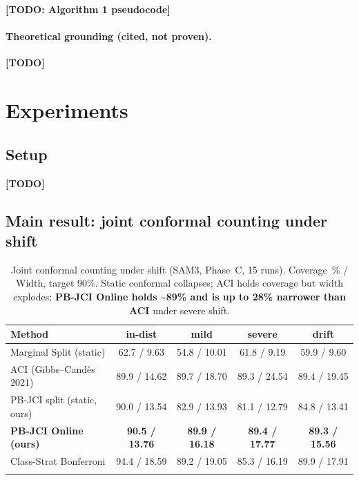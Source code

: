 \documentclass[pdflatex,sn-mathphys,Numbered]{sn-jnl}
\theoremstyle{remark}
\begin{document}
\textbf{[TODO: Algorithm 1 pseudocode]}

\paragraph{Theoretical grounding (cited, not proven).}
\textbf{[TODO]}

\section{Experiments}\label{sec:exp}

\subsection{Setup}\label{sec:setup}

\textbf{[TODO]}

\subsection{Main result: joint conformal counting under shift}\label{sec:main}

\begin{table}[t]
\caption{Joint conformal counting under shift (SAM3, Phase~C, 15 runs).
Coverage~\% / Width, target 90\%. Static conformal collapses; ACI holds
coverage but width explodes; \textbf{PB-JCI Online holds \textasciitilde89\%
and is up to 28\% narrower than ACI} under severe shift.}
\label{tab:main}
\begin{tabular}{@{}lcccc@{}}
\toprule
Method & in-dist & mild & severe & drift \\
\midrule
Marginal Split (static)       & 62.7 / 9.63  & 54.8 / 10.01 & 61.8 / 9.19  & 59.9 / 9.60 \\
ACI (Gibbs--Cand\`es 2021)    & 89.9 / 14.62 & 89.7 / 18.70 & 89.3 / 24.54 & 89.4 / 19.45 \\
PB-JCI split (static, ours)   & 90.0 / 13.54 & 82.9 / 13.93 & 81.1 / 12.79 & 84.8 / 13.41 \\
\textbf{PB-JCI Online (ours)} & \textbf{90.5 / 13.76} & \textbf{89.9 / 16.18} & \textbf{89.4 / 17.77} & \textbf{89.3 / 15.56} \\
Class-Strat Bonferroni        & 94.4 / 18.59 & 89.2 / 19.05 & 85.3 / 16.19 & 89.9 / 17.91 \\
\botrule
\end{tabular}
\end{table}
\end{document}
